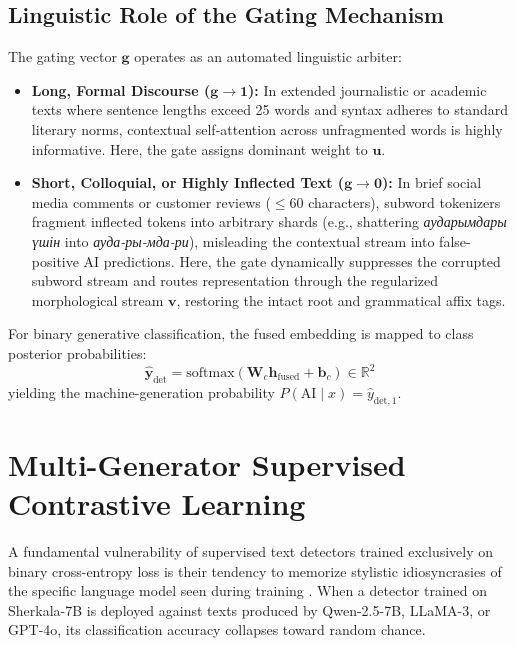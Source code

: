 \subsection{Linguistic Role of the Gating Mechanism}
The gating vector $\mathbf{g}$ operates as an automated linguistic arbiter:
\begin{itemize}
    \item \textbf{Long, Formal Discourse ($\mathbf{g} \to \mathbf{1}$):} In extended journalistic or academic texts where sentence lengths exceed 25 words and syntax adheres to standard literary norms, contextual self-attention across unfragmented words is highly informative. Here, the gate assigns dominant weight to $\mathbf{u}$.
    \item \textbf{Short, Colloquial, or Highly Inflected Text ($\mathbf{g} \to \mathbf{0}$):} In brief social media comments or customer reviews ($\le 60$ characters), subword tokenizers fragment inflected tokens into arbitrary shards (e.g., shattering \textit{аударымдары үшін} into \textit{ауда-ры-мда-ри}), misleading the contextual stream into false-positive AI predictions. Here, the gate dynamically suppresses the corrupted subword stream and routes representation through the regularized morphological stream $\mathbf{v}$, restoring the intact root and grammatical affix tags.
\end{itemize}

For binary generative classification, the fused embedding is mapped to class posterior probabilities:
\begin{equation}
    \label{eq:classification_head}
    \hat{\mathbf{y}}_{\text{det}} = \mathrm{softmax}(\mathbf{W}_c \mathbf{h}_{\text{fused}} + \mathbf{b}_c) \in \mathbb{R}^2
\end{equation}
yielding the machine-generation probability $P(\text{AI} \mid x) = \hat{y}_{\text{det}, 1}$.

\section{Multi-Generator Supervised Contrastive Learning}
\label{sec:multi_gen_supcon}

A fundamental vulnerability of supervised text detectors trained exclusively on binary cross-entropy loss is their tendency to memorize stylistic idiosyncrasies of the specific language model seen during training \citep{chakraborty2023possibilities,wang2024raid}. When a detector trained on Sherkala-7B is deployed against texts produced by Qwen-2.5-7B, LLaMA-3, or GPT-4o, its classification accuracy collapses toward random chance.

